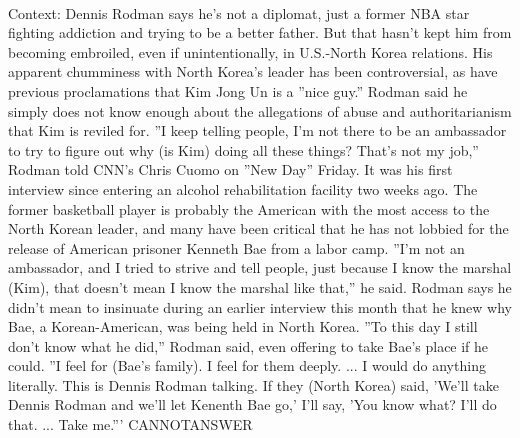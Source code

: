 \documentclass[11pt,a4paper, onecolumn]{article}
\begin{document}
\\ Context: Dennis Rodman says he's not a diplomat, just a former NBA star fighting addiction and trying to be a better father. But that hasn't kept him from becoming embroiled, even if unintentionally, in U.S.-North Korea relations. His apparent chumminess with North Korea's leader has been controversial, as have previous proclamations that Kim Jong Un is a ''nice guy.'' Rodman said he simply does not know enough about the allegations of abuse and authoritarianism that Kim is reviled for. ''I keep telling people, I'm not there to be an ambassador to try to figure out why (is Kim) doing all these things? That's not my job,'' Rodman told CNN's Chris Cuomo on ''New Day'' Friday. It was his first interview since entering an alcohol rehabilitation facility two weeks ago. The former basketball player is probably the American with the most access to the North Korean leader, and many have been critical that he has not lobbied for the release of American prisoner Kenneth Bae from a labor camp. ''I'm not an ambassador, and I tried to strive and tell people, just because I know the marshal (Kim), that doesn't mean I know the marshal like that,'' he said. Rodman says he didn't mean to insinuate during an earlier interview this month that he knew why Bae, a Korean-American, was being held in North Korea. ''To this day I still don't know what he did,'' Rodman said, even offering to take Bae's place if he could. ''I feel for (Bae's family). I feel for them deeply. ... I would do anything literally. This is Dennis Rodman talking. If they (North Korea) said, 'We'll take Dennis Rodman and we'll let Kenenth Bae go,' I'll say, 'You know what? I'll do that. ... Take me.''' CANNOTANSWER
\end{document}
